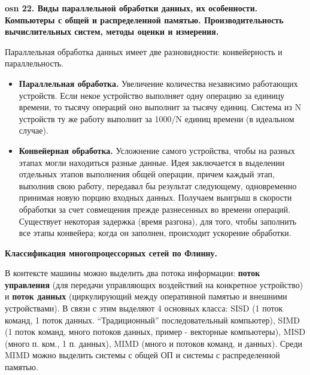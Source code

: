 \textbf{\LARGE osn 22. Виды параллельной обработки данных, их особенности. Компьютеры с общей и распределенной памятью. Производительность вычислительных систем, методы оценки и измерения.}


Параллельная обработка данных имеет две разновидности: конвейерность и параллельность.
\begin{itemize}
    \item \textbf{Параллельная обработка.} Увеличение количества независимо работающих устройств. Если некое устройство выполняет одну операцию за единицу времени, то тысячу операций оно выполнит за тысячу единиц. Система из N устройств ту же работу выполнит за 1000/N единиц времени (в идеальном случае).
    \item \textbf{Конвейерная обработка.} Усложнение самого устройства, чтобы на разных этапах могли находиться разные данные. Идея заключается в выделении отдельных этапов выполнения общей операции, причем каждый этап, выполнив свою работу, передавал бы результат следующему, одновременно принимая новую порцию входных данных. Получаем выигрыш в скорости обработки за счет совмещения прежде разнесенных во времени операций. Существует некоторая задержка (время разгона), для того, чтобы заполнить все этапы конвейера; когда он заполнен, происходит ускорение обработки.
\end{itemize}

\textbf{Классификация многопроцессорных сетей по Флинну.}

В контексте машины можно выделить два потока информации: \textbf{поток управления} (для передачи управляющих воздействий на конкретное устройство) и \textbf{поток данных} (циркулирующий между оперативной памятью и внешними устройствами). В связи с этим выделяют 4 основных класса: SISD (1 поток команд, 1 поток данных. ``Традиционный'' последовательный компьютер), SIMD (1 поток команд, много потоков данных, пример - векторные компьютеры), MISD (много п. ком., 1 п. данных), MIMD (много и потоков команд, и данных). Среди MIMD можно выделить системы с общей ОП и системы с распределенной памятью.

